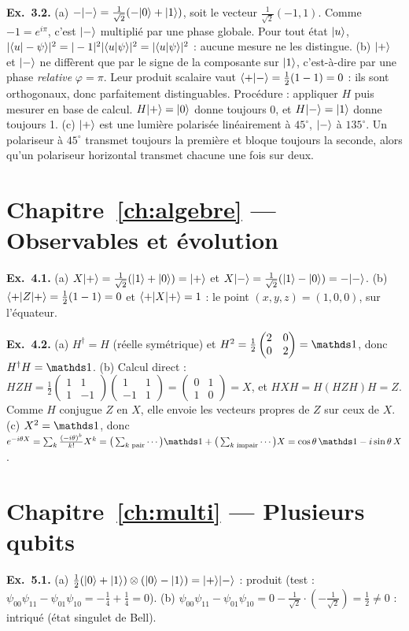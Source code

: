 \textbf{Ex.~3.2.} (a) $-\lvert -\rangle=\tfrac1{\sqrt2}(-\lvert 0\rangle+\lvert 1\rangle)$, soit le vecteur $\tfrac1{\sqrt2}(-1,1)$. Comme $-1=e^{i\pi}$, c'est $\lvert -\rangle$ multiplié par une phase globale. Pour tout état $\lvert u\rangle$, $|\langle u\vert -\psi\rangle|^2=|-1|^2|\langle u\vert \psi\rangle|^2=|\langle u\vert \psi\rangle|^2$ : aucune mesure ne les distingue. (b) $\lvert +\rangle$ et $\lvert -\rangle$ ne diffèrent que par le signe de la composante sur $\lvert 1\rangle$, c'est-à-dire par une phase \emph{relative} $\varphi=\pi$. Leur produit scalaire vaut $\langle +\vert -\rangle=\tfrac12(1-1)=0$ : ils sont orthogonaux, donc parfaitement distinguables. Procédure : appliquer $H$ puis mesurer en base de calcul. $H\lvert +\rangle=\lvert 0\rangle$ donne toujours 0, et $H\lvert -\rangle=\lvert 1\rangle$ donne toujours 1. (c) $\lvert +\rangle$ est une lumière polarisée linéairement à $45^\circ$, $\lvert -\rangle$ à $135^\circ$. Un polariseur à $45^\circ$ transmet toujours la première et bloque toujours la seconde, alors qu'un polariseur horizontal transmet chacune une fois sur deux.

\section*{Chapitre~\ref{ch:algebre} — Observables et évolution}
\textbf{Ex.~4.1.} (a) $X\lvert +\rangle=\tfrac1{\sqrt2}(\lvert 1\rangle+\lvert 0\rangle)=\lvert +\rangle$ et $X\lvert -\rangle=\tfrac1{\sqrt2}(\lvert 1\rangle-\lvert 0\rangle)=-\lvert -\rangle$. (b) $\langle +\rvert Z\lvert +\rangle=\tfrac12(1-1)=0$ et $\langle +\rvert X\lvert +\rangle=1$ : le point $(x,y,z)=(1,0,0)$, sur l'équateur.

\textbf{Ex.~4.2.} (a) $H^\dagger=H$ (réelle symétrique) et $H^2=\tfrac12\begin{pmatrix}2&0\\0&2\end{pmatrix}=\Id$, donc $H^\dagger H=\Id$. (b) Calcul direct : $HZH=\tfrac12\begin{pmatrix}1&1\\1&-1\end{pmatrix}\begin{pmatrix}1&1\\-1&1\end{pmatrix}=\begin{pmatrix}0&1\\1&0\end{pmatrix}=X$, et $HXH=H(HZH)H=Z$. Comme $H$ conjugue $Z$ en $X$, elle envoie les vecteurs propres de $Z$ sur ceux de $X$. (c) $X^2=\Id$, donc $e^{-i\theta X}=\sum_k\frac{(-i\theta)^k}{k!}X^k=\big(\sum_{k\text{ pair}}\cdots\big)\Id+\big(\sum_{k\text{ impair}}\cdots\big)X=\cos\theta\,\Id-i\sin\theta\,X$.

\section*{Chapitre~\ref{ch:multi} — Plusieurs qubits}
\textbf{Ex.~5.1.} (a) $\tfrac12(\lvert 0\rangle+\lvert 1\rangle)\otimes(\lvert 0\rangle-\lvert 1\rangle)=\lvert +\rangle\lvert -\rangle$ : produit (test : $\psi_{00}\psi_{11}-\psi_{01}\psi_{10}=-\tfrac14+\tfrac14=0$). (b) $\psi_{00}\psi_{11}-\psi_{01}\psi_{10}=0-\tfrac1{\sqrt2}\cdot(-\tfrac1{\sqrt2})=\tfrac12\neq0$ : intriqué (état singulet de Bell).

